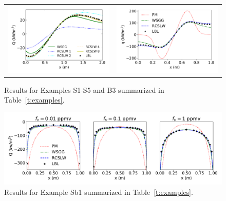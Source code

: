 \documentclass[preprint,12pt]{elsarticle}
\begin{document}
\begin{figure}
\begin{center}
\begin{tabular}{c c}
        \includegraphics[width=2.75 in]{fig_ex_S5c.pdf} &
        \includegraphics[width=2.75 in]{fig_ex_B3.pdf}
    \end{tabular}
    \caption{Results for Examples S1-S5 and B3 summarized in Table~\ref{t:examples}.}
    \label{f:examples}
    \end{center}
\end{figure}
%
\begin{figure}
    \begin{center}
        \includegraphics[width=5.5 in]{fig_ex_Sb1.pdf}
    \caption{Results for Example Sb1 summarized in Table~\ref{t:examples}.}
    \label{f:exSb1}
    \end{center}
\end{figure}
%
\end{document}

